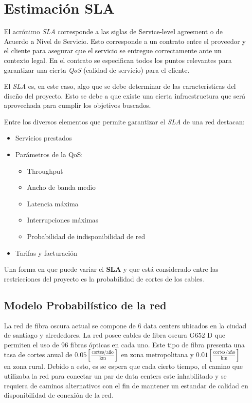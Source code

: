 \section{Estimación SLA}
\label{sec:SLA}

El acrónimo \emph{SLA} corresponde a las siglas de Service-level
agreement o de Acuerdo a Nivel de Servicio. Esto corresponde a un
contrato entre el proveedor y el cliente para asegurar que el servicio
se entregue correctamente ante un contexto legal. En el contrato se
especifican todos los puntos relevantes para garantizar una cierta
\emph{QoS} (calidad de servicio) para el cliente.

El \emph{SLA} es, en este caso, algo que se debe determinar de las
características del diseño del proyecto. Esto se debe a que existe una
cierta infraestructura que será aprovechada para cumplir los objetivos
buscados.

Entre los diversos elementos que permite garantizar el \emph{SLA} de
una red destacan:
\begin{itemize}
\item Servicios prestados
\item Parámetros de la QoS:
  \begin{itemize}
  \item Throughput
  \item Ancho de banda medio
  \item Latencia máxima
  \item Interrupciones máximas
  \item Probabilidad de indisponibilidad de red
  \end{itemize}
\item Tarifas y facturación
\end{itemize}

Una forma en que puede variar el \textbf{SLA} y que está considerado
entre las restricciones del proyecto es la probabilidad de cortes de
los cables.

\subsection{Modelo Probabilístico de la red}

La red de fibra oscura actual se compone de 6 data centers ubicados en la ciudad de santiago y alrededores. La red posee cables de fibra oscura G652 D que permiten el uso de 96 fibras ópticas en cada uno. Este tipo de fibra presenta una tasa de cortes anual de $0.05 [\frac{\text{cortes}/\text{año}}{\text{km}}]$ en zona metropolitana y $0.01 [\frac{\text{cortes}/\text{año}}{\text{km}}]$ en zona rural. Debido a esto, es se espera que cada cierto tiempo, el camino que utilizaba la red para conectar un par de data centers este inhabilitado y se requiera de caminos alternativos con el fin de mantener un estandar de calidad en disponibilidad de conexión de la red.

